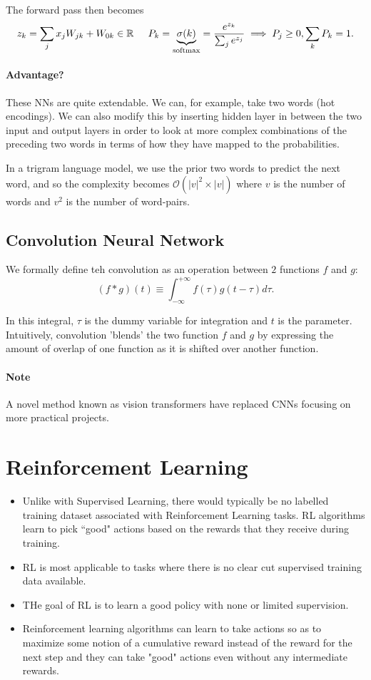 \documentclass{article}
\begin{document}
The forward pass then becomes 
$$z_k=\sum_j x_jW_{jk}+W_{0k}\in\mathbb{R}\hspace{.2in}P_k=\underbrace{\sigma(k)}_{\text{softmax}}=\frac{e^{z_k}}{\sum_j e^{z_j}}\implies P_j\geq 0,\sum_k P_k=1.$$

\paragraph{Advantage?} These NNs are quite extendable. We can, for example, take two words (hot encodings). We can also modify this by inserting hidden layer in between the two input and output layers in order to look at more complex combinations of the preceding two words in terms of how they have mapped to the probabilities.

In a trigram language model, we use the prior two words to predict the next word, and so the complexity becomes $\mathcal{O}(|v|^2\times|v|)$ where $v$ is the number of words and $v^2$ is the number of word-pairs.

\subsection{Convolution Neural Network}
We formally define teh convolution as an operation between $2$ functions $f$ and $g$:
$$(f*g)(t)\equiv\int_{-\infty}^{+\infty}f(\tau)g(t-\tau)d\tau.$$

In this integral, $\tau$ is the dummy variable for integration and $t$ is the parameter. Intuitively, convolution 'blends' the two function $f$ and $g$ by expressing the amount of overlap of one function as it is shifted over another function.

\paragraph{Note} A novel method known as vision transformers have replaced CNNs focusing on more practical projects.

\section{Reinforcement Learning}

\begin{itemize}
	\item Unlike with Supervised Learning, there would typically be no labelled training dataset associated with Reinforcement Learning tasks. RL algorithms learn to pick “good" actions based on the rewards that they receive during training.

	\item RL is most applicable to tasks where there is no clear cut supervised training data available.

	\item THe goal of RL is to learn a good policy with none or limited supervision.

	\item Reinforcement learning algorithms can learn to take actions so as to maximize some notion of a cumulative reward instead of the reward for the next step and they can take "good" actions even without any intermediate rewards.
\end{itemize}
\end{document}
